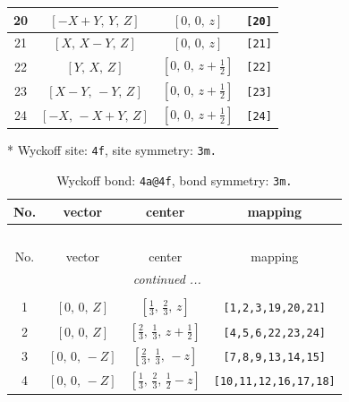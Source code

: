\documentclass[fleqn,8pt]{jsarticle}
\begin{document}
\begin{longtable}{cccc}
20 & $\left[ - X + Y,\, Y,\, Z \right]$ & $\left[ 0,\, 0,\, z \right]$ & {\tt [20]} \\ \hline
21 & $\left[ X,\, X - Y,\, Z \right]$ & $\left[ 0,\, 0,\, z \right]$ & {\tt [21]} \\ \hline
22 & $\left[ Y,\, X,\, Z \right]$ & $\left[ 0,\, 0,\, z + \frac{1}{2} \right]$ & {\tt [22]} \\ \hline
23 & $\left[ X - Y,\, - Y,\, Z \right]$ & $\left[ 0,\, 0,\, z + \frac{1}{2} \right]$ & {\tt [23]} \\ \hline
24 & $\left[ - X,\, - X + Y,\, Z \right]$ & $\left[ 0,\, 0,\, z + \frac{1}{2} \right]$ & {\tt [24]} \\
\end{longtable}
* Wyckoff site: {\tt 4f}, site symmetry: {\tt 3m.}
\renewcommand{\arraystretch}{1.2}
\begin{longtable}{cccc}
\caption{Wyckoff bond: {\tt 4a@4f}, bond symmetry: {\tt 3m.}}
 \\
 \hline \hline
No. & vector & center & mapping \\ \hline \endfirsthead

\multicolumn{3}{l}{\tablename\ \thetable{}} \\
 \hline \hline
No. & vector & center & mapping \\ \hline \endhead

 \hline \hline
\multicolumn{3}{r}{\footnotesize\it continued ...} \\ \endfoot

 \hline \hline
\multicolumn{3}{r}{} \\ \endlastfoot

1 & $\left[ 0,\, 0,\, Z \right]$ & $\left[ \frac{1}{3},\, \frac{2}{3},\, z \right]$ & {\tt [1,2,3,19,20,21]} \\ \hline
2 & $\left[ 0,\, 0,\, Z \right]$ & $\left[ \frac{2}{3},\, \frac{1}{3},\, z + \frac{1}{2} \right]$ & {\tt [4,5,6,22,23,24]} \\ \hline
3 & $\left[ 0,\, 0,\, - Z \right]$ & $\left[ \frac{2}{3},\, \frac{1}{3},\, - z \right]$ & {\tt [7,8,9,13,14,15]} \\ \hline
4 & $\left[ 0,\, 0,\, - Z \right]$ & $\left[ \frac{1}{3},\, \frac{2}{3},\, \frac{1}{2} - z \right]$ & {\tt [10,11,12,16,17,18]} \\
\end{longtable}
\renewcommand{\arraystretch}{1.2}
\end{document}
